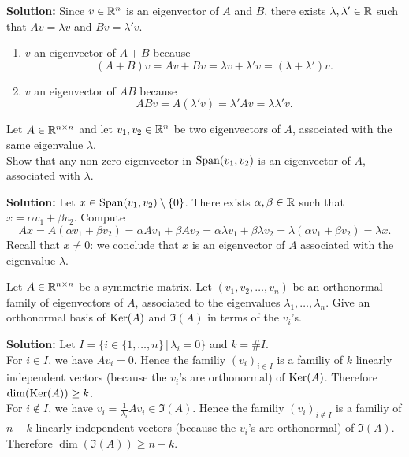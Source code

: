 \documentclass[11pt,nocut]{article}
\begin{document}
\textbf{Solution:}
Since $v \in \mathbb{R}^n$ is an eigenvector of $A$ and $B$, there exists $\lambda, \lambda' \in \mathbb{R}$ such that $Av= \lambda v$ and $Bv = \lambda' v$.
	\begin{enumerate}
		\item $v$ an eigenvector of $A+B$ because  
			$$
			(A+B)v = Av + Bv =
			\lambda v + \lambda' v = (\lambda + \lambda') v.
			$$
		\item $v$ an eigenvector of $AB$ because
			$$
			ABv = 
			A(\lambda' v) = \lambda' Av = \lambda \lambda' v.
			$$
	\end{enumerate}




\vspace{0.2cm}


\begin{problem}
	Let $A\in \mathbb{R}^{n \times n}$ and let $v_1,v_2 \in \mathbb{R}^n$ be two eigenvectors of $A$, associated with the same eigenvalue $\lambda$.
	\\
	Show that any non-zero eigenvector in ${{\rm Span}}(v_1,v_2)$ is an eigenvector of $A$, associated with $\lambda$.
\end{problem}
\textbf{Solution:}
Let $x \in {{\rm Span}}(v_1,v_2) \setminus \{0\}$. There exists $\alpha, \beta \in \mathbb{R}$ such that $x=\alpha v_1 + \beta v_2$. Compute
$$
Ax = A(\alpha v_1 + \beta v_2) 
= \alpha Av_1 + \beta Av_2
= \alpha \lambda v_1 + \beta \lambda v_2
= \lambda (\alpha v_1 + \beta v_2)
= \lambda x.
$$
Recall  that $x\neq 0$: we conclude that $x$ is an eigenvector of $A$ associated with the eigenvalue $\lambda$.

\vspace{0.2cm}
\begin{problem}
	Let $A\in \mathbb{R}^{n \times n}$ be a symmetric matrix.
	Let $(v_1,v_2, \dots, v_n)$ be an orthonormal family of eigenvectors of $A$, associated to the eigenvalues $\lambda_1, \dots, \lambda_n$. Give an orthonormal basis of ${{\rm Ker}}(A)$ and $\Im(A)$ in terms of the $v_i$'s.
\end{problem}

\textbf{Solution:}
Let $I = \{i \in \{1, \dots, n \} \, | \, \lambda_i = 0 \}$ and $k = \#I$.
\\

For $i \in I$, we have $Av_i = 0$. Hence the familiy $(v_i)_{i \in I}$ is a familiy of $k$ linearly independent vectors (because the $v_i$'s are orthonormal) of ${{\rm Ker}}(A)$. Therefore ${{\rm dim}}({{\rm Ker}}(A)) \geq k$.
\\

For $i \not\in I$, we have $v_i = \frac{1}{\lambda_i} A v_i \in \Im(A)$. Hence the familiy $(v_i)_{i \not\in I}$ is a familiy of $n-k$ linearly independent vectors (because the $v_i$'s are orthonormal) of $\Im(A)$. Therefore $\dim(\Im(A)) \geq n-k$.
\\
\end{document}

